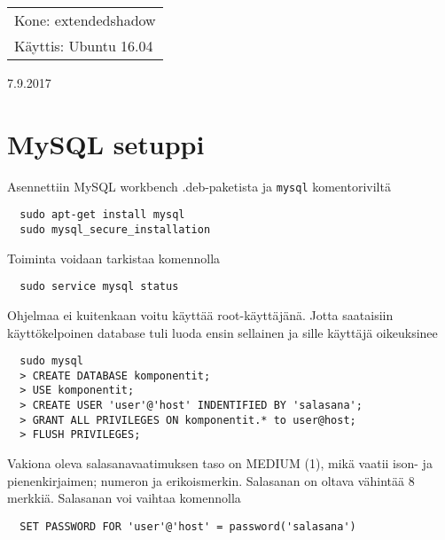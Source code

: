 \documentclass[main.tex]{subfiles}
\begin{document}
\thispagestyle{empty}
\begin{tabular}[t]{l}
Kone: extendedshadow\\
Käyttis: Ubuntu 16.04
\end{tabular}
\hfill 7.9.2017

\section{MySQL setuppi}

Asennettiin MySQL workbench .deb-paketista ja \texttt{mysql} komentoriviltä

\begin{lstlisting}
  sudo apt-get install mysql
  sudo mysql_secure_installation
\end{lstlisting}

Toiminta voidaan tarkistaa komennolla

\begin{lstlisting}
  sudo service mysql status
\end{lstlisting}

Ohjelmaa ei kuitenkaan voitu käyttää root-käyttäjänä. Jotta saataisiin käyttökelpoinen database tuli luoda ensin sellainen ja sille käyttäjä oikeuksinee

\begin{lstlisting}
  sudo mysql
  > CREATE DATABASE komponentit;
  > USE komponentit;
  > CREATE USER 'user'@'host' INDENTIFIED BY 'salasana';
  > GRANT ALL PRIVILEGES ON komponentit.* to user@host;
  > FLUSH PRIVILEGES;
\end{lstlisting}

Vakiona oleva salasanavaatimuksen taso on MEDIUM (1), mikä vaatii ison- ja pienenkirjaimen; numeron ja erikoismerkin. Salasanan on oltava vähintää 8 merkkiä. Salasanan voi vaihtaa komennolla

\begin{lstlisting}
  SET PASSWORD FOR 'user'@'host' = password('salasana')
\end{lstlisting}
\end{document}
